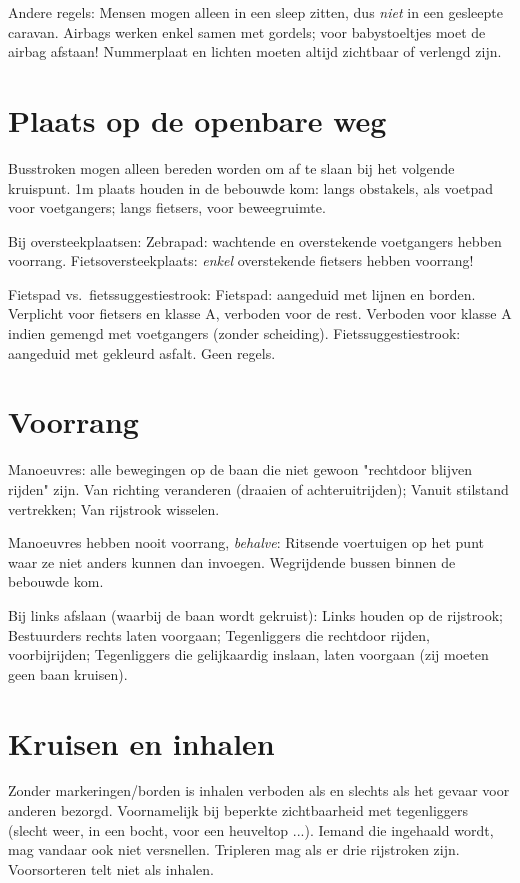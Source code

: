 \begin{outline}
\1 Andere regels:
	\2 Mensen mogen alleen in een sleep zitten, dus \emph{niet} in een gesleepte caravan.
	\2 Airbags werken enkel samen met gordels; voor babystoeltjes moet de airbag afstaan!
	\2 Nummerplaat en lichten moeten altijd zichtbaar of verlengd zijn.
\end{outline}

\section{Plaats op de openbare weg}
\begin{outline}
\1 Busstroken mogen alleen bereden worden om af te slaan bij het volgende kruispunt.
\1 1m plaats houden in de bebouwde kom:
	\2 langs obstakels, als voetpad voor voetgangers;
	\2 langs fietsers, voor beweegruimte.
	
\1 Bij oversteekplaatsen:
	\2 Zebrapad: wachtende en overstekende voetgangers hebben voorrang.
	\2 Fietsoversteekplaats: \emph{enkel} overstekende fietsers hebben voorrang!

\1 Fietspad vs.\ fietssuggestiestrook:
	\2 Fietspad: aangeduid met lijnen en borden. 
		\3 Verplicht voor fietsers en klasse A, verboden voor de rest.
		\3 Verboden voor klasse A indien gemengd met voetgangers (zonder scheiding).
	\2 Fietssuggestiestrook: aangeduid met gekleurd asfalt. Geen regels.
\end{outline}

\section{Voorrang}
\begin{outline}
\1 Manoeuvres: alle bewegingen op de baan die niet gewoon "rechtdoor blijven rijden" zijn.
	\2 Van richting veranderen (draaien of achteruitrijden);
	\2 Vanuit stilstand vertrekken;
	\2 Van rijstrook wisselen.
	
\1 Manoeuvres hebben nooit voorrang, \emph{behalve}:
	\2 Ritsende voertuigen op het punt waar ze niet anders kunnen dan invoegen.
	\2 Wegrijdende bussen binnen de bebouwde kom.
	
\1 Bij links afslaan (waarbij de baan wordt gekruist):
	\2 Links houden op de rijstrook;
	\2 Bestuurders rechts laten voorgaan;
	\2 Tegenliggers die rechtdoor rijden, voorbijrijden;
	\2 Tegenliggers die gelijkaardig inslaan, laten voorgaan (zij moeten geen baan kruisen).
\end{outline}

\section{Kruisen en inhalen}
\begin{outline}
\1 Zonder markeringen/borden is inhalen verboden als en slechts als het gevaar voor anderen bezorgd.
	\2 Voornamelijk bij beperkte zichtbaarheid met tegenliggers (slecht weer, in een bocht, voor een heuveltop ...).
	\2 Iemand die ingehaald wordt, mag vandaar ook niet versnellen.
\1 Tripleren mag als er drie rijstroken zijn.
\1 Voorsorteren telt niet als inhalen.
\end{outline}

